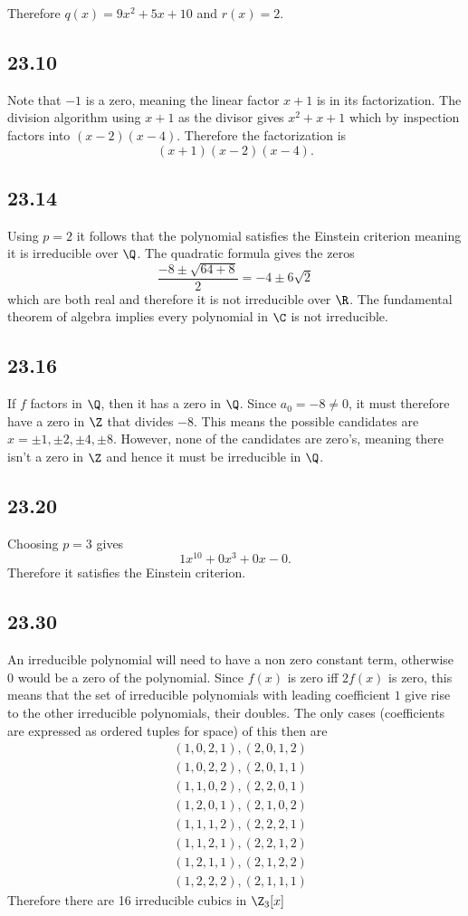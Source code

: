 \documentclass[12pt,titlepage]{extarticle}
\begin{document}
Therefore $q(x) = 9x^2 + 5x + 10$ and $r(x) = 2$.

\subsection*{23.10}
Note that $-1$ is a zero, meaning the linear factor $x+1$ is in its factorization. The division algorithm using $x+1$ as the divisor gives $x^2 + x + 1$ which by inspection factors into $(x-2)(x-4)$. Therefore the factorization is
\[
    (x+1)(x-2)(x-4)
.\]

\subsection*{23.14}
Using $p = 2$ it follows that the polynomial satisfies the Einstein criterion meaning it is irreducible over $\Q$. The quadratic formula gives the zeros
\[
    \frac{-8 \pm \sqrt{64 + 8}}{2} = -4 \pm 6\sqrt{2}
\]
which are both real and therefore it is not irreducible over $\R$. The fundamental theorem of algebra implies every polynomial in $\C$ is not irreducible.

\subsection*{23.16}
If $f$ factors in $\Q$, then it has a zero in $\Q$. Since $a_0 = -8 \neq 0$, it must therefore have a zero in $\Z$ that divides $-8$. This means the possible candidates are $x = \pm 1, \pm 2, \pm 4, \pm 8$. However, none of the candidates are zero's, meaning there isn't a zero in $\Z$ and hence it must be irreducible in $\Q$.

\subsection*{23.20}
Choosing $p = 3$ gives
\[
    1x^{10} + 0x^3 + 0x - 0
.\]
Therefore it satisfies the Einstein criterion.

\subsection*{23.30}
An irreducible polynomial will need to have a non zero constant term, otherwise $0$ would be a zero of the polynomial. Since $f(x)$ is zero iff $2 f(x)$ is zero, this means that the set of irreducible polynomials with leading coefficient $1$ give rise to the other irreducible polynomials, their doubles. The only cases (coefficients are expressed as ordered tuples for space) of this then are 
\begin{align*}
    &(1, 0, 2, 1), (2, 0, 1, 2) \\
    &(1, 0, 2, 2), (2, 0, 1, 1) \\
    &(1, 1, 0, 2), (2, 2, 0, 1) \\
    &(1, 2, 0, 1), (2, 1, 0, 2) \\
    &(1, 1, 1, 2), (2, 2, 2, 1) \\
    &(1, 1, 2, 1), (2, 2, 1, 2) \\
    &(1, 2, 1, 1), (2, 1, 2, 2) \\
    &(1, 2, 2, 2), (2, 1, 1, 1)
\end{align*}
Therefore there are 16 irreducible cubics in $\Z_3[x]$
\end{document}
